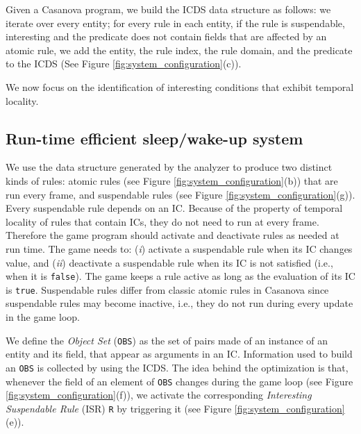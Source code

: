 Given a Casanova program, we build the ICDS data structure as follows: we iterate over every entity; for every rule in each entity, if the rule is suspendable, interesting and the predicate does not contain fields that are affected by an atomic rule, we add the entity, the rule index, the rule domain, and the predicate to the ICDS (See Figure \ref{fig:system_configuration}(c)).

We now focus on the identification of interesting conditions that exhibit temporal locality.

\subsection{Run-time efficient sleep/wake-up system}

We use the data structure generated by the analyzer to produce two distinct kinds of rules: atomic rules (see Figure \ref{fig:system_configuration}(b)) that are run every frame, and suspendable rules (see Figure \ref{fig:system_configuration}(g)). Every suspendable rule depends on an IC. %
Because of the property of temporal locality of rules that contain ICs, they do not need to run at every frame. Therefore the game program should activate and deactivate rules as needed at run time. The game needs to: (\textit{i}) activate a suspendable rule when its IC changes value, and (\textit{ii}) deactivate a suspendable rule when its IC is not satisfied (i.e., when it is \texttt{false}). The game keeps a rule active as long as the evaluation of its IC is \texttt{true}. Suspendable rules differ from classic atomic rules in Casanova since suspendable rules may become inactive, i.e., they do not run during every update in the game loop.

We define the \emph{Object Set} (\texttt{OBS}) as the set of pairs made of an instance of an entity and its field, that appear as arguments in an IC. Information used to build an \texttt{OBS} is collected by using the ICDS. The idea behind the optimization is that, whenever the field of an element of \texttt{OBS} changes during the game loop (see Figure \ref{fig:system_configuration}(f)), we activate the corresponding \emph{Interesting Suspendable Rule} (ISR) \texttt{R} by triggering it (see Figure \ref{fig:system_configuration}(e)).


